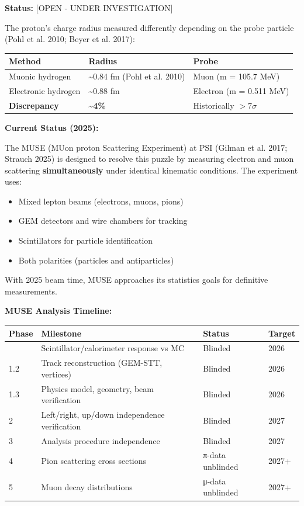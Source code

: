 \documentclass[
  11pt,
  letterpaper,
  twoside,
  openright]{book}
\providecommand{\tightlist}{%
  \setlength{\itemsep}{0pt}\setlength{\parskip}{0pt}}
\begin{document}
\textbf{Status:} {[}OPEN - UNDER INVESTIGATION{]}

The proton's charge radius measured differently depending on the probe
particle (Pohl et al. 2010; Beyer et al. 2017):

\begin{longtable}[]{@{}lll@{}}
\toprule\noalign{}
Method & Radius & Probe \\
\midrule\noalign{}
\endhead
\bottomrule\noalign{}
\endlastfoot
Muonic hydrogen & \textasciitilde0.84 fm (Pohl et al. 2010) & Muon (m =
105.7 MeV) \\
Electronic hydrogen & \textasciitilde0.88 fm & Electron (m = 0.511
MeV) \\
\textbf{Discrepancy} & \textbf{\textasciitilde4\%} & Historically
\(> 7\sigma\) \\
\end{longtable}

\textbf{Current Status (2025):}

The MUSE (MUon proton Scattering Experiment) at PSI (Gilman et al. 2017;
Strauch 2025) is designed to resolve this puzzle by measuring electron
and muon scattering \textbf{simultaneously} under identical kinematic
conditions. The experiment uses:

\begin{itemize}
\tightlist
\item
  Mixed lepton beams (electrons, muons, pions)
\item
  GEM detectors and wire chambers for tracking
\item
  Scintillators for particle identification
\item
  Both polarities (particles and antiparticles)
\end{itemize}

With 2025 beam time, MUSE approaches its statistics goals for definitive
measurements.

\textbf{MUSE Analysis Timeline:}

\begin{longtable}[]{@{}llll@{}}
\toprule\noalign{}
Phase & Milestone & Status & Target \\
\midrule\noalign{}
\endhead
\bottomrule\noalign{}
\endlastfoot
1.1 & Scintillator/calorimeter response vs MC & Blinded & 2026 \\
1.2 & Track reconstruction (GEM-STT, vertices) & Blinded & 2026 \\
1.3 & Physics model, geometry, beam verification & Blinded & 2026 \\
2 & Left/right, up/down independence verification & Blinded & 2027 \\
3 & Analysis procedure independence & Blinded & 2027 \\
4 & Pion scattering cross sections & π-data unblinded & 2027+ \\
5 & Muon decay distributions & μ-data unblinded & 2027+ \\
\end{longtable}
\end{document}
